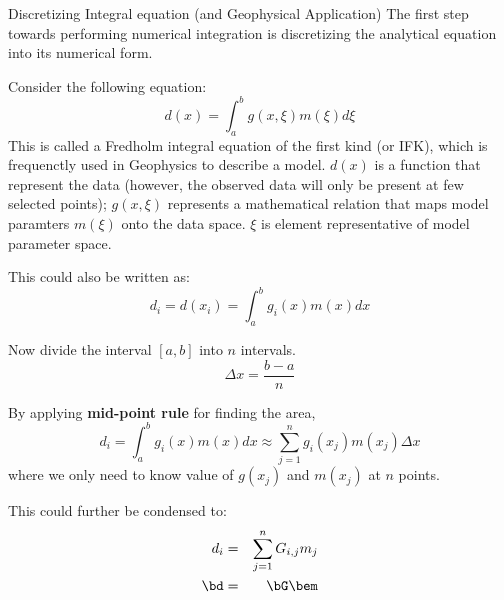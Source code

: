 \documentclass[11pt,titlepage,fleqn]{article}
\begin{document}
\begin{section}{Discretizing Integral equation (and Geophysical Application)}
The first step towards performing numerical integration is discretizing the analytical equation into its numerical form.

Consider the following equation:
\begin{equation}
d(x) = \int_a^b g(x,\xi)m(\xi)d\xi
\end{equation}
This is called a Fredholm integral equation of the first kind (or IFK), which is frequenctly used in Geophysics to describe a model. $d(x)$ is a function that represent the data (however, the observed data will only be present at few selected points); $g(x,\xi)$ represents a mathematical relation that maps model paramters $m(\xi)$ onto the data space. $\xi$ is element representative of model parameter space.

This could also be written as:
\begin{equation}
d_i = d(x_i) = \int_a^b g_i(x) m(x) dx
\end{equation}

Now divide the interval $[a,b]$ into $n$ intervals. 
\begin{equation}
\Delta x = \frac{b-a}{n}
\end{equation}

By applying {\bf mid-point rule} for finding the area, 
\begin{equation}
d_i = \int_a^b g_i(x) m(x) dx \approx \sum_{j=1}^n g_i(x_j)m(x_j)\Delta x
\end{equation}
where we only need to know value of $g(x_j)$ and $m(x_j)$ at $n$ points.

This could further be condensed to:
\begin{eqnarray}
d_i &=& \sum_{j=1}^n G_{i,j} m_j \\
\bd &=& \bG \bem
\end{eqnarray}

\end{section}
\end{document}

